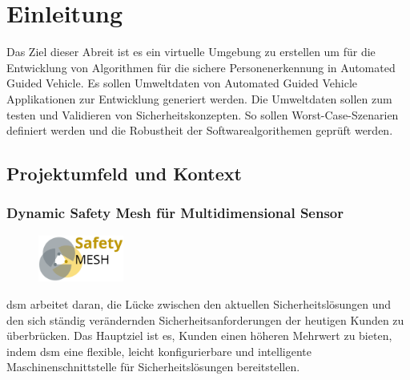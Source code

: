 \chapter{Einleitung}
Das Ziel dieser Abreit ist es ein virtuelle Umgebung zu erstellen um für die Entwicklung von Algorithmen für die sichere Personenerkennung in Automated Guided Vehicle. 
Es sollen Umweltdaten von Automated Guided Vehicle Applikationen zur Entwicklung generiert werden. Die Umweltdaten sollen zum testen und Validieren von Sicherheitskonzepten. So sollen Worst-Case-Szenarien definiert werden und die Robustheit der Softwarealgorithemen geprüft werden.\\



\section{Projektumfeld und Kontext}%
\subsection*{Dynamic Safety Mesh für Multidimensional Sensor}

\begin{figure} %
    \centering
    \includegraphics[width=0.25\textwidth]{images/image-2023-1-25_6-39-37.png}
\end{figure}

\ac{dsm} arbeitet daran, die Lücke zwischen den aktuellen Sicherheitslösungen und den sich ständig verändernden Sicherheitsanforderungen der heutigen Kunden zu überbrücken. Das Hauptziel ist es, Kunden einen höheren Mehrwert zu bieten, indem \ac{dsm} eine flexible, leicht konfigurierbare und intelligente Maschinenschnittstelle für Sicherheitslösungen bereitstellen.\\

